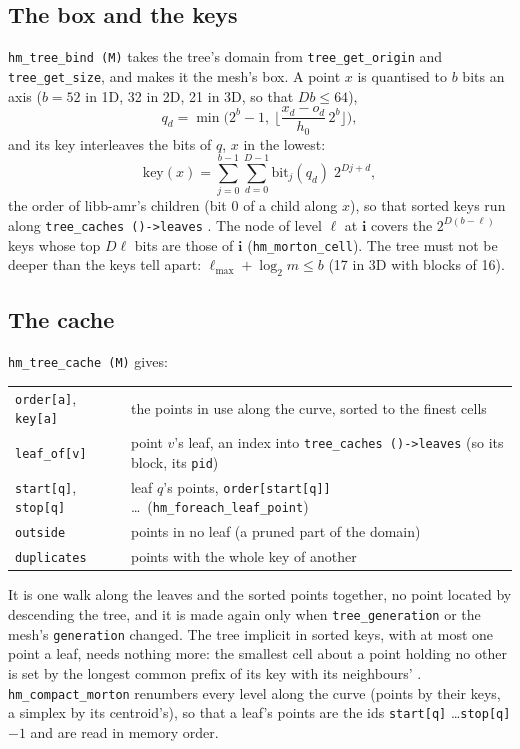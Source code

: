 \documentclass[10pt,a4paper]{article}
\theoremstyle{definition}
\newcommand{\fn}[1]{\texttt{#1}}
\begin{document}
\subsection{The box and the keys}

\fn{hm\_tree\_bind (M)} takes the tree's domain from \fn{tree\_get\_origin}
and \fn{tree\_get\_size}, and makes it the mesh's box. A point $x$ is
quantised to $b$ bits an axis ($b = 52$ in 1D, 32 in 2D, 21 in 3D, so that
$D b \le 64$),
\[
  q_d = \min \Big( 2^b - 1,\ \Big\lfloor \frac{x_d - o_d}{h_0}\, 2^b
    \Big\rfloor \Big),
\]
and its key interleaves the bits of $q$, $x$ in the lowest:
\[
  \mathrm{key}(x) = \sum_{j=0}^{b-1} \sum_{d=0}^{D-1}
    \mathrm{bit}_j(q_d)\; 2^{D j + d},
\]
the order of libb-amr's children (bit 0 of a child along $x$), so that
sorted keys run along \fn{tree\_caches ()->leaves} \cite{morton}. The node of
level $\ell$ at $\mathbf{i}$ covers the $2^{D (b - \ell)}$ keys whose top
$D \ell$ bits are those of $\mathbf{i}$ (\fn{hm\_morton\_cell}). The tree must
not be deeper than the keys tell apart: $\ell_{\max} + \log_2 m \le b$ (17
in 3D with blocks of 16).

\subsection{The cache}

\fn{hm\_tree\_cache (M)} gives:
\begin{center}
\begin{tabular}{@{}ll@{}}
  \toprule
  \fn{order[a]}, \fn{key[a]} & the points in use along the curve, sorted
    to the finest cells \\
  \fn{leaf\_of[v]} & point $v$'s leaf, an index into \fn{tree\_caches
    ()->leaves} (so its block, its \fn{pid}) \\
  \fn{start[q]}, \fn{stop[q]} & leaf $q$'s points, \fn{order[start[q]]}
    \ldots\ (\fn{hm\_foreach\_leaf\_point}) \\
  \fn{outside} & points in no leaf (a pruned part of the domain) \\
  \fn{duplicates} & points with the whole key of another \\
  \bottomrule
\end{tabular}
\end{center}
It is one walk along the leaves and the sorted points together, no point
located by descending the tree, and it is made again only when
\fn{tree\_generation} or the mesh's \fn{generation} changed. The tree
implicit in sorted keys, with at most one point a leaf, needs nothing more:
the smallest cell about a point holding no other is set by the longest
common prefix of its key with its neighbours' \cite{sundar, karras}.
\fn{hm\_compact\_morton} renumbers every level along the curve (points by
their keys, a simplex by its centroid's), so that a leaf's points are the
ids \fn{start[q]} \ldots \fn{stop[q]} $- 1$ and are read in memory order.
\end{document}
